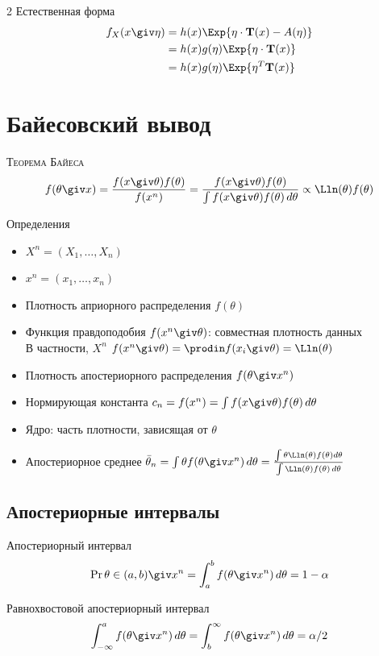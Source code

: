 \documentclass[landscape]{article}
\begin{document}
\begin{multicols*}{2}
Естественная форма
\begin{align*}
f_X(x \giv \eta)
&= h(x) \Exp{\eta\cdot \mathbf{T}(x) - A(\eta)} \\
&= h(x) g(\eta) \Exp{\eta\cdot \mathbf{T}(x)} \\
&= h(x) g(\eta) \Exp{\eta^T \mathbf{T}(x)}
\end{align*}

\section{Байесовский вывод}

\textsc{Теорема Байеса}
\[f(\theta\giv x)
= \frac{f(x\giv\theta)f(\theta)}{f(x^n)}
= \frac{f(x\giv\theta)f(\theta)}
       {\int f(x\giv\theta)f(\theta)\,d\theta} \propto \Lln(\theta)f(\theta)\]

Определения
\begin{itemize}
  \item $X^n = (X_1,\ldots,X_n)$
  \item $x^n = (x_1,\ldots,x_n)$
  \item Плотность априорного распределения $f(\theta)$
  \item Функция правдоподобия $f(x^n \giv \theta)$: совместная плотность данных\\
    В частности, $X^n$ \iid \imp $f(x^n\giv\theta) =
    \displaystyle\prodin f(x_i\giv\theta) = \Lln(\theta)$
  \item Плотность апостериорного распределения $f(\theta\giv x^n)$
  \item Нормирующая константа $c_n = f(x^n)
    = \int f(x\giv\theta)f(\theta)\,d\theta$
  \item Ядро: часть плотности, зависящая от $\theta$
  \item Апостериорное среднее $\bar\theta_n
    = \int\theta f(\theta\giv x^n)\,d\theta
    = \frac{\int\theta\Lln(\theta)f(\theta)d\theta}
           {\int\Lln(\theta)f(\theta)\,d\theta}$
\end{itemize}

\subsection{Апостериорные интервалы}

Апостериорный интервал
\[\Pr{\theta\in (a,b)\giv x^n}
= \int_{a}^{b} f(\theta\giv x^n)\,d\theta
= 1-\alpha\]

Равнохвостовой апостериорный интервал
\[\int_{-\infty}^{a} f(\theta\giv x^n)\,d\theta
= \int_{b}^{\infty} f(\theta\giv x^n)\,d\theta = \alpha/2\]


\end{multicols*}
\end{document}
